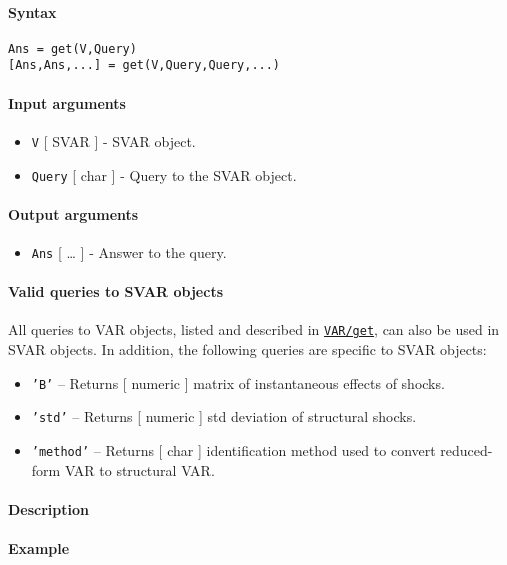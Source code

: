 


	\paragraph{Syntax}

\begin{verbatim}
Ans = get(V,Query)
[Ans,Ans,...] = get(V,Query,Query,...)
\end{verbatim}

\paragraph{Input arguments}

\begin{itemize}
\item
  \texttt{V} {[} SVAR {]} - SVAR object.
\item
  \texttt{Query} {[} char {]} - Query to the SVAR object.
\end{itemize}

\paragraph{Output arguments}

\begin{itemize}
\itemsep1pt\parskip0pt
\item
  \texttt{Ans} {[} \ldots{} {]} - Answer to the query.
\end{itemize}

\paragraph{Valid queries to SVAR
objects}

All queries to VAR objects, listed and described in
\href{VAR/get}{\texttt{VAR/get}}, can also be used in SVAR objects. In
addition, the following queries are specific to SVAR objects:

\begin{itemize}
\item
  \texttt{'B'} -- Returns {[} numeric {]} matrix of instantaneous
  effects of shocks.
\item
  \texttt{'std'} -- Returns {[} numeric {]} std deviation of structural
  shocks.
\item
  \texttt{'method'} -- Returns {[} char {]} identification method used
  to convert reduced-form VAR to structural VAR.
\end{itemize}

\paragraph{Description}

\paragraph{Example}


